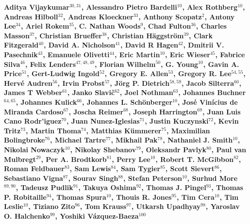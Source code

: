 
{\bf
Aditya Vijaykumar$^{30,31}$, Alessandro Pietro Bardelli$^{10}$, Alex Rothberg$^{10}$, Andreas Hilboll$^{32}$, Andreas Kloeckner$^{33}$, Anthony Scopatz$^{2}$, Antony Lee$^{34}$, Ariel Rokem$^{35}$, C. Nathan Woods$^{9}$, Chad Fulton$^{36}$, Charles Masson$^{37}$, Christian Brueffer$^{38}$, Christian H\"aggstr\"om$^{39}$, Clark Fitzgerald$^{40}$, David A. Nicholson$^{41}$, David R Hagen$^{42}$, Dmitrii V. Pasechnik$^{43}$, Emanuele Olivetti$^{44}$, Eric Martin$^{10}$, Eric Wieser$^{45}$, Fabrice Silva$^{46}$, Felix Lenders$^{47,48,49}$, Florian Wilhelm$^{50}$, G. Young$^{10}$, Gavin A. Price$^{51}$, Gert-Ludwig Ingold$^{52}$, Gregory E. Allen$^{53}$, Gregory R. Lee$^{54,55}$, Herv\'e Audren$^{56}$, Irvin Probst$^{57}$, J\"org P. Dietrich$^{58,59}$, Jacob Silterra$^{60}$, James T Webber$^{61}$, Janko Slavi\v{c}$^{62}$, Joel Nothman$^{63}$, Johannes Buchner$^{64,65}$, Johannes Kulick$^{66}$, Johannes L. Sch\"{o}nberger$^{10}$, Jos\'e Vin\'icius de Miranda Cardoso$^{67}$, Joscha Reimer$^{68}$, Joseph Harrington$^{69}$, Juan Luis Cano Rodr'iguez$^{70}$, Juan Nunez-Iglesias$^{71}$, Justin Kuczynski$^{72}$, Kevin Tritz$^{73}$, Martin Thoma$^{74}$, Matthias K\"ummerer$^{75}$, Maximilian Bolingbroke$^{76}$, Michael Tartre$^{77}$, Mikhail Pak$^{78}$, Nathaniel J. Smith$^{10}$, Nikolai Nowaczyk$^{10}$, Nikolay Shebanov$^{79}$, Oleksandr Pavlyk$^{80}$, Paul van Mulbregt$^{29}$, Per A. Brodtkorb$^{81}$, Perry Lee$^{10}$, Robert T. McGibbon$^{82}$, Roman Feldbauer$^{83}$, Sam Lewis$^{84}$, Sam Tygier$^{85}$, Scott Sievert$^{86}$, Sebastiano Vigna$^{87}$, Sourav Singh$^{88}$, Stefan Peterson$^{10}$, Surhud More$^{89,90}$, Tadeusz Pudlik$^{91}$, Takuya Oshima$^{92}$, Thomas J. Pingel$^{93}$, Thomas P. Robitaille$^{94}$, Thomas Spura$^{10}$, Thouis R. Jones$^{95}$, Tim Cera$^{10}$, Tim Leslie$^{10}$, Tiziano Zito$^{96}$, Tom Krauss$^{97}$, Utkarsh Upadhyay$^{98}$, Yaroslav O. Halchenko$^{99}$, Yoshiki V\'azquez-Baeza$^{100}$
}
\newline
\hfill \break
